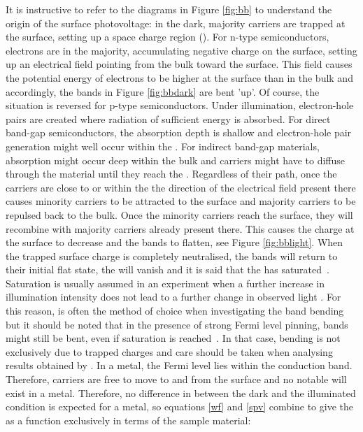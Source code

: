 It is instructive to refer to the diagrams in Figure \ref{fig:bb} to understand the origin of the surface photovoltage: in the dark, majority carriers are trapped at the surface, setting up a space charge region (\src{}). For n-type semiconductors, electrons are in the majority, accumulating negative charge on the surface, setting up an electrical field pointing from the bulk toward the surface. This field causes the potential energy of electrons to be higher at the surface than in the bulk and accordingly, the bands in Figure \ref{fig:bbdark} are bent 'up'. Of course, the situation is reversed for p-type semiconductors. Under illumination, electron-hole pairs are created where radiation of sufficient energy is absorbed. For direct band-gap semiconductors, the absorption depth is shallow and electron-hole pair generation might well occur within the \src{}. For indirect band-gap materials, absorption might occur deep within the bulk and carriers might have to diffuse through the material until they reach the \src{}. Regardless of their path, once the carriers are close to or within the \src{} the direction of the electrical field present there causes minority carriers to be attracted to the surface and majority carriers to be repulsed back to the bulk. Once the minority carriers reach the surface, they will recombine with majority carriers already present there. This causes the charge at the surface to decrease and the bands to flatten, see Figure \ref{fig:bblight}. When the trapped surface charge is completely neutralised, the bands will return to their initial flat state, the \src{} will vanish and it is said that the \spv{} has saturated~\cite{yates_bandbend}. Saturation is usually assumed in an experiment when a further increase in illumination intensity does not lead to a further change in observed light \cpd{}. For this reason, \spv{} is often the method of choice when investigating the band bending~\cite{macnamara_tempdepspv,macnamara_tempdepspv2} but it should be noted that in the presence of strong Fermi level pinning, bands might still be bent, even if \spv{} saturation is reached~\cite{kronik_spv}. In that case, bending is not exclusively due to trapped charges and care should be taken when analysing results obtained by \spv{}. In a metal, the Fermi level lies within the conduction band. Therefore, carriers are free to move to and from the surface and no notable \src{} will exist in a metal. Therefore, no difference in \cpd{} between the dark and the illuminated condition is expected for a metal, so equations \eqref{wf} and \eqref{spv} combine to give the \spv{} as a function exclusively in terms of the sample material:

